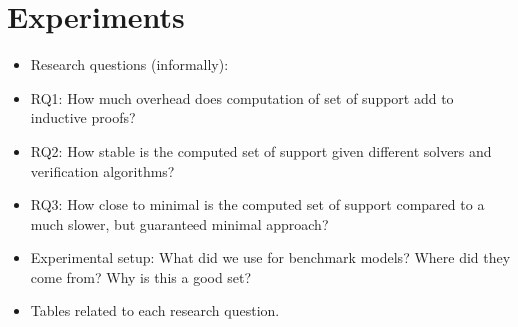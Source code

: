 \section{Experiments}
\label{sec:exprm}

\begin{itemize}
    \item Research questions (informally):
    \item \quad RQ1: How much overhead does computation of set of support add to inductive proofs?
    \item \quad RQ2: How stable is the computed set of support given different solvers
        and verification algorithms?
    \item \quad RQ3: How close to minimal is the computed set of support compared to a much slower, but guaranteed minimal approach?
    \item Experimental setup: What did we use for benchmark models?  Where did they come from?  Why is this a good set? 
    \item Tables related to each research question.
\end{itemize}